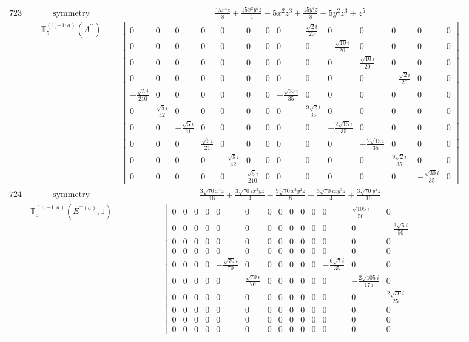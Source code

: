 \documentclass[fleqn,8pt,landscape]{jsarticle}
\begin{document}
\begin{longtable}{ccc}
$ 723 $ & $ \text{symmetry} $ & $ \frac{15 x^{4} z}{8} + \frac{15 x^{2} y^{2} z}{4} - 5 x^{2} z^{3} + \frac{15 y^{4} z}{8} - 5 y^{2} z^{3} + z^{5} $ \\
$  $ & $ \mathbb{T}_{5}^{(1,-1;a)}(A^{\prime\prime}) $ & $ \begin{bmatrix} 0 & 0 & 0 & 0 & 0 & 0 & 0 & 0 & \frac{\sqrt{2} i}{20} & 0 & 0 & 0 & 0 & 0 \\ 0 & 0 & 0 & 0 & 0 & 0 & 0 & 0 & 0 & - \frac{\sqrt{10} i}{20} & 0 & 0 & 0 & 0 \\ 0 & 0 & 0 & 0 & 0 & 0 & 0 & 0 & 0 & 0 & \frac{\sqrt{10} i}{20} & 0 & 0 & 0 \\ 0 & 0 & 0 & 0 & 0 & 0 & 0 & 0 & 0 & 0 & 0 & - \frac{\sqrt{2} i}{20} & 0 & 0 \\ - \frac{\sqrt{5} i}{210} & 0 & 0 & 0 & 0 & 0 & 0 & - \frac{\sqrt{30} i}{35} & 0 & 0 & 0 & 0 & 0 & 0 \\ 0 & \frac{\sqrt{5} i}{42} & 0 & 0 & 0 & 0 & 0 & 0 & \frac{9 \sqrt{2} i}{35} & 0 & 0 & 0 & 0 & 0 \\ 0 & 0 & - \frac{\sqrt{5} i}{21} & 0 & 0 & 0 & 0 & 0 & 0 & - \frac{2 \sqrt{15} i}{35} & 0 & 0 & 0 & 0 \\ 0 & 0 & 0 & \frac{\sqrt{5} i}{21} & 0 & 0 & 0 & 0 & 0 & 0 & - \frac{2 \sqrt{15} i}{35} & 0 & 0 & 0 \\ 0 & 0 & 0 & 0 & - \frac{\sqrt{5} i}{42} & 0 & 0 & 0 & 0 & 0 & 0 & \frac{9 \sqrt{2} i}{35} & 0 & 0 \\ 0 & 0 & 0 & 0 & 0 & \frac{\sqrt{5} i}{210} & 0 & 0 & 0 & 0 & 0 & 0 & - \frac{\sqrt{30} i}{35} & 0 \end{bmatrix} $ \\ \hline
$ 724 $ & $ \text{symmetry} $ & $ \frac{3 \sqrt{70} x^{4} z}{16} + \frac{3 \sqrt{70} i x^{3} y z}{4} - \frac{9 \sqrt{70} x^{2} y^{2} z}{8} - \frac{3 \sqrt{70} i x y^{3} z}{4} + \frac{3 \sqrt{70} y^{4} z}{16} $ \\
$  $ & $ \mathbb{T}_{5}^{(1,-1;a)}(E^{\prime\prime(a)},1) $ & $ \begin{bmatrix} 0 & 0 & 0 & 0 & 0 & 0 & 0 & 0 & 0 & 0 & 0 & 0 & \frac{\sqrt{105} i}{50} & 0 \\ 0 & 0 & 0 & 0 & 0 & 0 & 0 & 0 & 0 & 0 & 0 & 0 & 0 & - \frac{3 \sqrt{5} i}{50} \\ 0 & 0 & 0 & 0 & 0 & 0 & 0 & 0 & 0 & 0 & 0 & 0 & 0 & 0 \\ 0 & 0 & 0 & 0 & 0 & 0 & 0 & 0 & 0 & 0 & 0 & 0 & 0 & 0 \\ 0 & 0 & 0 & 0 & - \frac{\sqrt{70} i}{70} & 0 & 0 & 0 & 0 & 0 & 0 & - \frac{6 \sqrt{7} i}{35} & 0 & 0 \\ 0 & 0 & 0 & 0 & 0 & \frac{\sqrt{70} i}{70} & 0 & 0 & 0 & 0 & 0 & 0 & - \frac{2 \sqrt{105} i}{175} & 0 \\ 0 & 0 & 0 & 0 & 0 & 0 & 0 & 0 & 0 & 0 & 0 & 0 & 0 & \frac{2 \sqrt{30} i}{25} \\ 0 & 0 & 0 & 0 & 0 & 0 & 0 & 0 & 0 & 0 & 0 & 0 & 0 & 0 \\ 0 & 0 & 0 & 0 & 0 & 0 & 0 & 0 & 0 & 0 & 0 & 0 & 0 & 0 \\ 0 & 0 & 0 & 0 & 0 & 0 & 0 & 0 & 0 & 0 & 0 & 0 & 0 & 0 \end{bmatrix} $ \\ \hline

\end{longtable}
\end{document}
